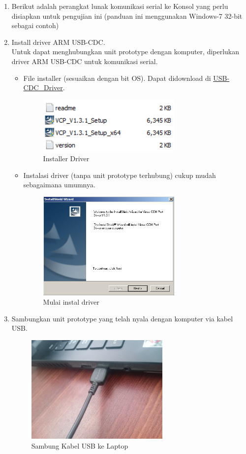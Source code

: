 \documentclass{article}
\begin{document}
	\begin{enumerate}
		\item Berikut adalah perangkat lunak komunikasi serial ke Konsol yang perlu disiapkan untuk pengujian ini (panduan ini menggunakan Windows-7 32-bit sebagai contoh)

		\item Install driver ARM USB-CDC.\\
		Untuk dapat menghubungkan unit prototype dengan komputer,
		diperlukan driver ARM USB-CDC untuk komunikasi serial.

		\begin{itemize}
			\item File installer (sesuaikan dengan bit OS).
			Dapat didownload di \href{https://drive.google.com/drive/folders/19gXVrxR68SFHQUGGGgKb0Da03oV7Rh41?usp=share_link}{USB-CDC\_Driver}.
			\begin{figure}[H]
				\centering
				\includegraphics[width=200pt]{images/software/driver}
				\caption{Installer Driver}
			\end{figure}

			\item Instalasi driver (tanpa unit prototype terhubung) cukup mudah sebagaimana umumnya.
			\begin{figure}[H]
				\centering
				\includegraphics[width=200pt]{images/software/install_driver}
				\caption{Mulai instal driver}
			\end{figure}
		\end{itemize}

		\item Sambungkan unit prototype yang telah nyala dengan komputer via kabel USB.
		\begin{figure}[H]
			\centering
			\includegraphics[width=200pt]{images/pasang/laptop_usb}
			\caption{Sambung Kabel USB ke Laptop}
		\end{figure}


\end{enumerate}
\end{document}
